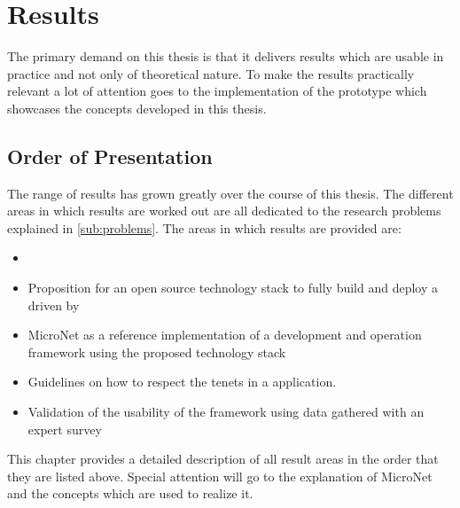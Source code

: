 \chapter{Results}

The primary demand on this thesis is that it delivers results which are
usable in practice and not only of theoretical nature. To make the results
practically relevant a lot of attention goes to the implementation of the
prototype which showcases the concepts developed in this thesis.

\section{Order of Presentation}

The range of results has grown greatly over the course of this thesis. The
different areas in which results are worked out are all dedicated to the
research problems explained in \autoref{sub:problems}. The areas in which
results are provided are:

\begin{itemize}
  \item \item Proposition for an  open source technology stack to fully build and
  deploy a \og{} driven by \mss{}
  \item MicroNet as a reference implementation of a \ms{} \og{} development and
  operation framework using the proposed technology stack
  \item Guidelines on how to respect the \ms{} tenets in a \og{} \ms{}
  application.
  \item Validation of the usability of the framework using data gathered with an
  expert survey 
\end{itemize}

This chapter provides a detailed description of all result areas in the order
that they are listed above. Special attention will go to the explanation of
MicroNet and the concepts which are used to realize it.

\newpage

\newpage

\newpage
